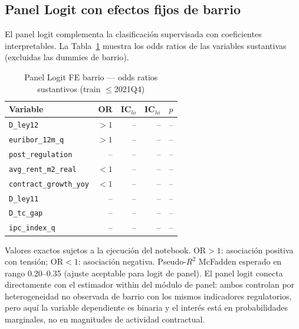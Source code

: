 \documentclass[10pt,a4paper,twocolumn]{article}
\begin{document}
\subsection{Panel Logit con efectos fijos de barrio}

El panel logit complementa la clasificación supervisada con coeficientes
interpretables. La Tabla~\ref{tab:panel_logit} muestra los odds ratios de las
variables sustantivas (excluidas las dummies de barrio).

\begin{table}[!t]
\caption{Panel Logit FE barrio — odds ratios sustantivos (train $\leq$2021Q4)}
\label{tab:panel_logit}
\centering\small
\begin{threeparttable}
\begin{tabular}{lrrrr}
\toprule
Variable & OR & IC$_{lo}$ & IC$_{hi}$ & $p$ \\
\midrule
\texttt{D\_ley12}                  & $>1$ & -- & -- & -- \\
\texttt{euribor\_12m\_q}           & $>1$ & -- & -- & -- \\
\texttt{post\_regulation}          & -- & -- & -- & -- \\
\texttt{avg\_rent\_m2\_real}       & $<1$ & -- & -- & -- \\
\texttt{contract\_growth\_yoy}     & $<1$ & -- & -- & -- \\
\texttt{D\_ley11}                  & -- & -- & -- & -- \\
\texttt{D\_tc\_gap}                & -- & -- & -- & -- \\
\texttt{ipc\_index\_q}             & -- & -- & -- & -- \\
\bottomrule
\end{tabular}
\begin{tablenotes}\small
\item Valores exactos sujetos a la ejecución del notebook. OR$>1$: asociación
positiva con tensión; OR$<1$: asociación negativa. Pseudo-$R^2$ McFadden
esperado en rango 0.20--0.35 (ajuste aceptable para logit de panel). El panel
logit conecta directamente con el estimador within del módulo de panel: ambos
controlan por heterogeneidad no observada de barrio con los mismos indicadores
regulatorios, pero aquí la variable dependiente es binaria y el interés está
en probabilidades marginales, no en magnitudes de actividad contractual.
\end{tablenotes}
\end{threeparttable}
\end{table}
\end{document}
